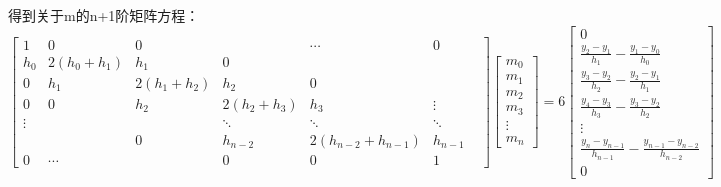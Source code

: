 \documentclass[type=master,oneside]{fduthesis}
\begin{document}
得到关于m的n+1阶矩阵方程：
\begin{equation}
  \left[\begin{array}{ccccccc}
      1      & 0                         & 0                         &                           & \cdots                        & 0         \\
      h_{0}  & 2\left(h_{0}+h_{1}\right) & h_{1}                     & 0                         &                               &         & \\
      0      & h_{1}                     & 2\left(h_{1}+h_{2}\right) & h_{2}                     & 0                             &         & \\
      0      & 0                         & h_{2}                     & 2\left(h_{2}+h_{3}\right) & h_{3}                         & \vdots    \\
      \vdots &                           &                           & \ddots                    & \ddots                        & \ddots  & \\
             &                           & 0                         & h_{n-2}                   & 2\left(h_{n-2}+h_{n-1}\right) & h_{n-1}   \\
      0      & \cdots                    &                           & 0                         & 0                             & 1
    \end{array}\right]\left[\begin{array}{c}
      m_{0}  \\
      m_{1}  \\
      m_{2}  \\
      m_{3}  \\
      \vdots \\
      m_{n}
    \end{array}\right]=6\left[\begin{array}{c}
      0                                                             \\
      \frac{y_{2}-y_{1}}{h_{1}}-\frac{y_{1}-y_{0}}{h_{0}}           \\
      \frac{y_{3}-y_{2}}{h_{2}}-\frac{y_{2}-y_{1}}{h_{1}}           \\
      \frac{y_{4}-y_{3}}{h_{3}}-\frac{y_{3}-y_{2}}{h_{2}}           \\
      \vdots                                                        \\
      \frac{y_{n}-y_{n-1}}{h_{n-1}}-\frac{y_{n-1}-y_{n-2}}{h_{n-2}} \\
      0
    \end{array}\right]
\end{equation}
\end{document}
